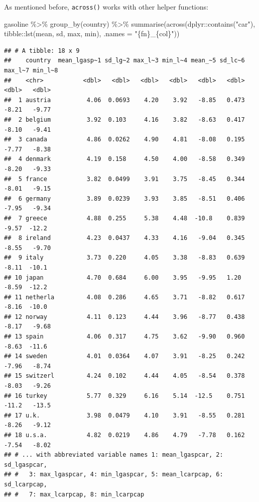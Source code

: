 \documentclass[
]{article}
\newenvironment{Shaded}{\begin{snugshade}}{\end{snugshade}}
\newcommand{\AttributeTok}[1]{\textcolor[rgb]{0.77,0.63,0.00}{#1}}
\newcommand{\FunctionTok}[1]{\textcolor[rgb]{0.00,0.00,0.00}{#1}}
\newcommand{\NormalTok}[1]{#1}
\newcommand{\SpecialCharTok}[1]{\textcolor[rgb]{0.00,0.00,0.00}{#1}}
\newcommand{\StringTok}[1]{\textcolor[rgb]{0.31,0.60,0.02}{#1}}
\begin{document}
As mentioned before, \texttt{across()} works with other helper functions:

\begin{Shaded}
\begin{Highlighting}[]
\NormalTok{gasoline }\SpecialCharTok{\%\textgreater{}\%}
  \FunctionTok{group\_by}\NormalTok{(country) }\SpecialCharTok{\%\textgreater{}\%}
  \FunctionTok{summarise}\NormalTok{(}\FunctionTok{across}\NormalTok{(dplyr}\SpecialCharTok{::}\FunctionTok{contains}\NormalTok{(}\StringTok{"car"}\NormalTok{), tibble}\SpecialCharTok{::}\FunctionTok{lst}\NormalTok{(mean, sd, max, min), }\AttributeTok{.names =} \StringTok{"\{fn\}\_\{col\}"}\NormalTok{))}
\end{Highlighting}
\end{Shaded}

\begin{verbatim}
## # A tibble: 18 x 9
##    country  mean_lgasp~1 sd_lg~2 max_l~3 min_l~4 mean_~5 sd_lc~6 max_l~7 min_l~8
##    <chr>           <dbl>   <dbl>   <dbl>   <dbl>   <dbl>   <dbl>   <dbl>   <dbl>
##  1 austria          4.06  0.0693    4.20    3.92   -8.85   0.473   -8.21   -9.77
##  2 belgium          3.92  0.103     4.16    3.82   -8.63   0.417   -8.10   -9.41
##  3 canada           4.86  0.0262    4.90    4.81   -8.08   0.195   -7.77   -8.38
##  4 denmark          4.19  0.158     4.50    4.00   -8.58   0.349   -8.20   -9.33
##  5 france           3.82  0.0499    3.91    3.75   -8.45   0.344   -8.01   -9.15
##  6 germany          3.89  0.0239    3.93    3.85   -8.51   0.406   -7.95   -9.34
##  7 greece           4.88  0.255     5.38    4.48  -10.8    0.839   -9.57  -12.2 
##  8 ireland          4.23  0.0437    4.33    4.16   -9.04   0.345   -8.55   -9.70
##  9 italy            3.73  0.220     4.05    3.38   -8.83   0.639   -8.11  -10.1 
## 10 japan            4.70  0.684     6.00    3.95   -9.95   1.20    -8.59  -12.2 
## 11 netherla         4.08  0.286     4.65    3.71   -8.82   0.617   -8.16  -10.0 
## 12 norway           4.11  0.123     4.44    3.96   -8.77   0.438   -8.17   -9.68
## 13 spain            4.06  0.317     4.75    3.62   -9.90   0.960   -8.63  -11.6 
## 14 sweden           4.01  0.0364    4.07    3.91   -8.25   0.242   -7.96   -8.74
## 15 switzerl         4.24  0.102     4.44    4.05   -8.54   0.378   -8.03   -9.26
## 16 turkey           5.77  0.329     6.16    5.14  -12.5    0.751  -11.2   -13.5 
## 17 u.k.             3.98  0.0479    4.10    3.91   -8.55   0.281   -8.26   -9.12
## 18 u.s.a.           4.82  0.0219    4.86    4.79   -7.78   0.162   -7.54   -8.02
## # ... with abbreviated variable names 1: mean_lgaspcar, 2: sd_lgaspcar,
## #   3: max_lgaspcar, 4: min_lgaspcar, 5: mean_lcarpcap, 6: sd_lcarpcap,
## #   7: max_lcarpcap, 8: min_lcarpcap
\end{verbatim}
\end{document}
